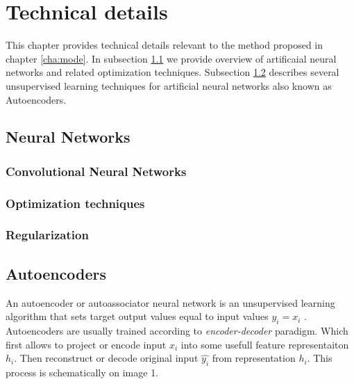 
\chapter{Technical details}
\label{cha:tede}

This chapter provides technical details relevant to the method proposed in chapter \ref{cha:mode}.
In subsection \ref{cha:nn} we provide overview of artificaial neural networks and related optimization techniques.
Subsection \ref{cha:ae} describes several unsupervised learning techniques for artificial neural networks also known as Autoencoders.

\section{Neural Networks}
\label{cha:nn}

\subsection{Convolutional Neural Networks}
\label{cha:cnn}

\subsection{Optimization techniques}
\subsection{Regularization}






\section{Autoencoders}\label{cha:ae}
An autoencoder or autoassociator neural network is an unsupervised learning algorithm that sets target output values equal to input values $y_i=x_i$ \cite{Ng2011,RanzatoMarcAurelio2007}.
Autoencoders are usually trained according to \textit{encoder-decoder} paradigm.
Which first allows to project or encode input $x_i$ into some usefull feature representaiton $h_i$.
Then reconstruct or decode original input $\hat{y_i}$ from representation $h_i$.
This process is schematically on image 1.

